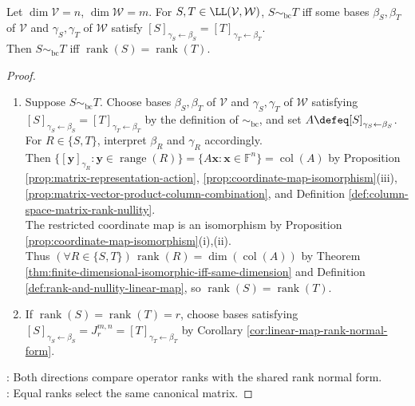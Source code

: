 \begin{corollary} \label{cor:linear-map-equivalence-by-rank} \\
Let $\dim\mathcal{V}=n$, $\dim\mathcal{W}=m$. For $S,T\in\LL(\mathcal{V},\mathcal{W})$,  $S\sim_{\mathrm{bc}}T$ iff some bases $\beta_S,\beta_T$ of $\mathcal{V}$ and $\gamma_S,\gamma_T$ of $\mathcal{W}$ satisfy $[S]_{\gamma_S\leftarrow\beta_S}=[T]_{\gamma_T\leftarrow\beta_T}$.\\
Then $S\sim_{\mathrm{bc}}T$ iff $\operatorname{rank}(S)=\operatorname{rank}(T)$.
\begin{proof}
\begin{enumerate}[label=\roman*.]
\setlength{\itemsep}{0pt}
\item[$(\Rightarrow)$] Suppose $S\sim_{\mathrm{bc}}T$. Choose bases $\beta_S,\beta_T$ of $\mathcal{V}$ and $\gamma_S,\gamma_T$ of $\mathcal{W}$ satisfying $[S]_{\gamma_S\leftarrow\beta_S}=[T]_{\gamma_T\leftarrow\beta_T}$ by the definition of $\sim_{\mathrm{bc}}$, and set $A\defeq[S]_{\gamma_S\leftarrow\beta_S}$. For $R\in\{S,T\}$, interpret $\beta_R$ and $\gamma_R$ accordingly.\\
Then $\{[\mathbf{y}]_{\gamma_R}:\mathbf{y}\in\operatorname{range}(R)\}=\{A\mathbf{x}:\mathbf{x}\in\mathbb{F}^n\}=\operatorname{col}(A)$ by Proposition \ref{prop:matrix-representation-action}, \ref{prop:coordinate-map-isomorphism}(iii), \ref{prop:matrix-vector-product-column-combination}, and Definition \ref{def:column-space-matrix-rank-nullity}.\\
The restricted coordinate map is an isomorphism by Proposition \ref{prop:coordinate-map-isomorphism}(i),(ii).\\
Thus $(\forall R\in\{S,T\})\,\operatorname{rank}(R)=\dim(\operatorname{col}(A))$ by Theorem \ref{thm:finite-dimensional-isomorphic-iff-same-dimension} and Definition \ref{def:rank-and-nullity-linear-map}, so $\operatorname{rank}(S)=\operatorname{rank}(T)$.
\item[$(\Leftarrow)$] If $\operatorname{rank}(S)=\operatorname{rank}(T)=r$, choose bases satisfying $[S]_{\gamma_S\leftarrow\beta_S}=J_r^{m,n}=[T]_{\gamma_T\leftarrow\beta_T}$ by Corollary \ref{cor:linear-map-rank-normal-form}.
\end{enumerate}
: Both directions compare operator ranks with the shared rank normal form.\\
: Equal ranks select the same canonical matrix.
\end{proof}
\end{corollary}

